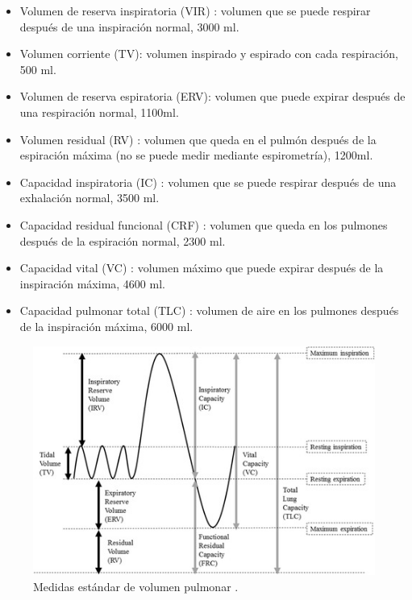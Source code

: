 \documentclass[12pt]{article}
\begin{document}
\begin{itemize}
    \item Volumen de reserva inspiratoria (VIR) : volumen que se puede respirar después de una inspiración normal, 3000 ml.
    \item Volumen corriente (TV): volumen inspirado y espirado con cada respiración, 500 ml.
    \item Volumen de reserva espiratoria (ERV): volumen que puede expirar después de una respiración normal, 1100ml.
    \item Volumen residual (RV) : volumen que queda en el pulmón después de la espiración máxima (no se puede medir mediante espirometría), 1200ml.
    \item Capacidad inspiratoria (IC) : volumen que se puede respirar después de una exhalación normal, 3500 ml.
    \item Capacidad residual funcional (CRF) : volumen que queda en los pulmones después de la espiración normal, 2300 ml.
    \item Capacidad vital (VC) : volumen máximo que puede expirar después de la inspiración máxima, 4600 ml. 
    \item Capacidad pulmonar total (TLC) : volumen de aire en los pulmones después de la inspiración máxima, 6000 ml.
    
\end{itemize}


\begin{figure}[ht]
\centering
\includegraphics[scale=0.6]{imag/volumeslung.jpeg}
\caption{Medidas estándar de volumen pulmonar \cite{18}. }
\label{3}
\end{figure}
\FloatBarrier
\end{document}
